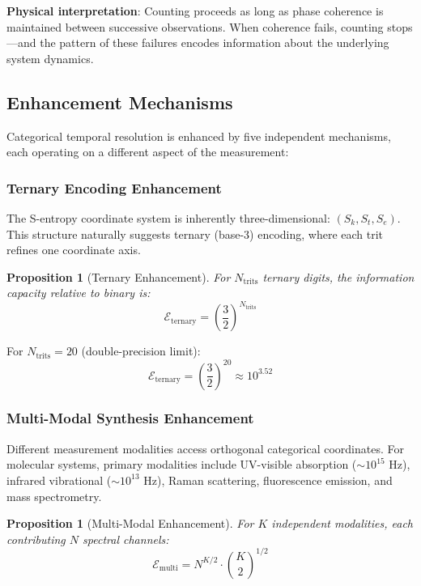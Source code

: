 \documentclass[twocolumn,10pt]{article}
\newtheorem{proposition}[theorem]{Proposition}
\begin{document}
\textbf{Physical interpretation}: Counting proceeds as long as phase coherence is maintained between successive observations. When coherence fails, counting stops---and the pattern of these failures encodes information about the underlying system dynamics.

\subsection{Enhancement Mechanisms}

Categorical temporal resolution is enhanced by five independent mechanisms, each operating on a different aspect of the measurement:

\subsubsection{Ternary Encoding Enhancement}

The S-entropy coordinate system is inherently three-dimensional: $(S_k, S_t, S_e)$. This structure naturally suggests ternary (base-3) encoding, where each trit refines one coordinate axis.

\begin{proposition}[Ternary Enhancement]
\label{prop:ternary}
For $N_{\text{trits}}$ ternary digits, the information capacity relative to binary is:
\begin{equation}
    \mathcal{E}_{\text{ternary}} = \left(\frac{3}{2}\right)^{N_{\text{trits}}}
\end{equation}
\end{proposition}

For $N_{\text{trits}} = 20$ (double-precision limit):
\begin{equation}
    \mathcal{E}_{\text{ternary}} = \left(\frac{3}{2}\right)^{20} \approx 10^{3.52}
\end{equation}

\subsubsection{Multi-Modal Synthesis Enhancement}

Different measurement modalities access orthogonal categorical coordinates. For molecular systems, primary modalities include UV-visible absorption ($\sim 10^{15}$ Hz), infrared vibrational ($\sim 10^{13}$ Hz), Raman scattering, fluorescence emission, and mass spectrometry.

\begin{proposition}[Multi-Modal Enhancement]
\label{prop:multimodal}
For $K$ independent modalities, each contributing $N$ spectral channels:
\begin{equation}
    \mathcal{E}_{\text{multi}} = N^{K/2} \cdot \binom{K}{2}^{1/2}
\end{equation}
\end{proposition}
\end{document}
